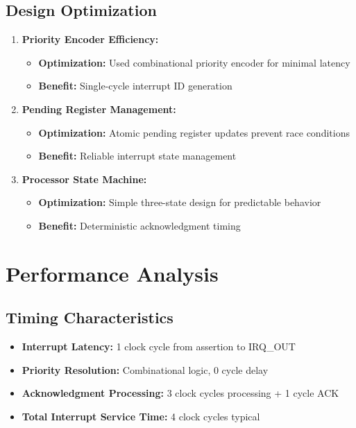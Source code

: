 \documentclass[12pt,a4paper]{article}
\begin{document}
\subsection{Design Optimization}
\begin{enumerate}
    \item \textbf{Priority Encoder Efficiency:} 
        \begin{itemize}
            \item \textbf{Optimization:} Used combinational priority encoder for minimal latency
            \item \textbf{Benefit:} Single-cycle interrupt ID generation
        \end{itemize}
    
    \item \textbf{Pending Register Management:} 
        \begin{itemize}
            \item \textbf{Optimization:} Atomic pending register updates prevent race conditions
            \item \textbf{Benefit:} Reliable interrupt state management
        \end{itemize}
    
    \item \textbf{Processor State Machine:} 
        \begin{itemize}
            \item \textbf{Optimization:} Simple three-state design for predictable behavior
            \item \textbf{Benefit:} Deterministic acknowledgment timing
        \end{itemize}
\end{enumerate}

\section{Performance Analysis}
\subsection{Timing Characteristics}
\begin{itemize}
    \item \textbf{Interrupt Latency:} 1 clock cycle from assertion to IRQ\_OUT
    \item \textbf{Priority Resolution:} Combinational logic, 0 cycle delay
    \item \textbf{Acknowledgment Processing:} 3 clock cycles processing + 1 cycle ACK
    \item \textbf{Total Interrupt Service Time:} 4 clock cycles typical
\end{itemize}
\end{document}
